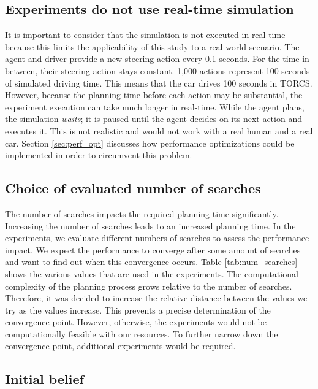 \subsection{Experiments do not use real-time simulation}

It is important to consider that the simulation is not executed in real-time because this limits the applicability of this study to a real-world scenario. The agent and driver provide a new steering action every 0.1 seconds. For the time in between, their steering action stays constant. 1,000 actions represent 100 seconds of simulated driving time. This means that the car drives 100 seconds in TORCS. However, because the planning time before each action may be substantial, the experiment execution can take much longer in real-time. While the agent plans, the simulation \emph{waits}; it is paused until the agent decides on its next action and executes it. This is not realistic and would not work with a real human and a real car. Section \ref{sec:perf_opt} discusses how performance optimizations could be implemented in order to circumvent this problem. 

\subsection{Choice of evaluated number of searches}

 

The number of searches impacts the required planning time significantly. Increasing the number of searches leads to an increased planning time. In the experiments, we evaluate different numbers of searches to assess the performance impact. We expect the performance to converge after some amount of searches and want to find out when this convergence occurs. Table \ref{tab:num_searches} shows the various values that are used in the experiments. The computational complexity of the planning process grows relative to the number of searches. Therefore, it was decided to increase the relative distance between the values we try as the values increase. This prevents a precise determination of the convergence point. However, otherwise, the experiments would not be computationally feasible with our resources. To further narrow down the convergence point, additional experiments would be required.

\subsection{Initial belief}

